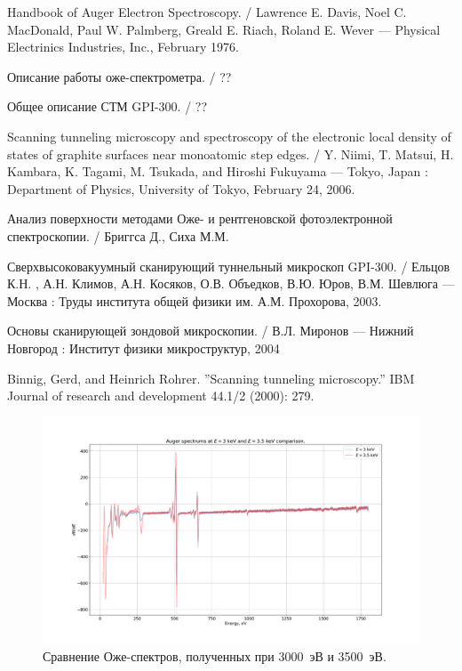 \documentclass[a4paper, 12pt]{article}
\begin{document}
	\newpage
	
	\begin{thebibliography}{2}
		
		 Handbook of Auger Electron Spectroscopy. /  Lawrence E. Davis, Noel C. MacDonald, Paul W. Palmberg, Greald E. Riach, Roland E. Wever --- Physical Electrinics Industries, Inc., February 1976.
		
		 Описание работы оже-спектрометра. / ??
		
		 Общее описание СТМ GPI-300. / ??
		
		 Scanning tunneling microscopy and spectroscopy of the electronic local density of states of graphite surfaces near monoatomic step edges. / Y. Niimi, T. Matsui, H. Kambara, K. Tagami, M. Tsukada, and Hiroshi Fukuyama --- Tokyo, Japan : Department of Physics, University of Tokyo, February 24, 2006.
		
		 Анализ поверхности методами Оже- и рентгеновской фотоэлектронной спектроскопии. / Бриггса Д., Сиха М.М.
		
		 Сверхвысоковакуумный сканирующий туннельный микроскоп GPI-300. / Ельцов К.Н. , А.Н. Климов, А.Н. Косяков, О.В. Объедков, В.Ю. Юров, В.М. Шевлюга --- Москва : Труды института общей физики им. А.М. Прохорова, 2003.
		
		 Основы сканирующей зондовой микроскопии. / В.Л. Миронов --- Нижний Новгород : Институт физики микроструктур, 2004
		
		 Binnig, Gerd, and Heinrich Rohrer. ''Scanning tunneling microscopy.'' IBM Journal of research and development 44.1/2 (2000): 279.
		
	\end{thebibliography}
	
	
	\newpage
	
	
	\begin{figure}[H]
		\centering
		\includegraphics[width=1.3\linewidth, angle=-90]{1_Auge_double}
		\caption{Сравнение Оже-спектров, полученных при 3000~эВ и 3500~эВ.}
		\label{fig:1_Auge_double}
	\end{figure}
	
\end{document}
